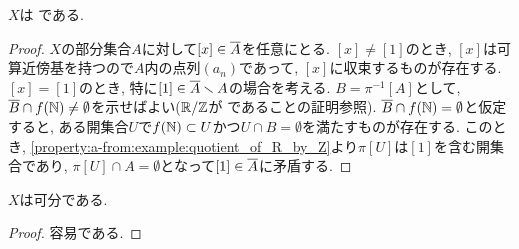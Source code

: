 \documentclass[uplatex, dvipdfmx, a4paper, 12pt, class=jsbook, crop=false]{standalone}
\begin{document}
\begin{property}
	$ X $は \Frechet である.
\end{property}

\begin{proof}
	$ X $の部分集合$ A $に対して$ [x] \in \overline{A}$を任意にとる. $[x] \neq [1]$のとき, $[x]$は可算近傍基を持つので$A$内の点列$(a_n)$であって, $[x]$に収束するものが存在する. $[x] = [1]$のとき, 特に$ [1] \in \overline{A} \smallsetminus A$の場合を考える. $B = \pi^{-1}[A]$として, $\overline{B} \cap f(\mathbb{N}) 
	\neq \emptyset$を示せばよい($\mathbb{R} / \mathbb{Z}$が \Frechet であることの証明参照). $\overline{B} \cap f(\mathbb{N}) = \emptyset$と仮定すると, ある開集合$ U $で$f(\mathbb{N}) \subset U$かつ$U \cap B =\emptyset$を満たすものが存在する. このとき, \ref{property:a-from:example:quotient_of_R_by_Z}より$\pi[U]$は$[1]$を含む開集合であり,
	$ \pi[U] \cap A = \emptyset$となって$ [1] \in \overline{A}$に矛盾する.
\end{proof}

\begin{property}
	$ X $は可分である.
\end{property}

\begin{proof}
	容易である.
\end{proof}
\end{document}
